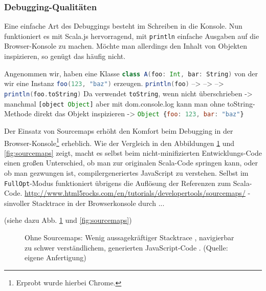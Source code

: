 \documentclass[a4paper, 12pt, hidelinks, listof=totoc, listoftables=totoc, bibliography=totoc]{scrreprt}
\newcommand{\code}[1]{\lstinline[language=Scala, style=inline]|#1|}
\newcommand{\scala}[1]{\lstinline[language=Scala, style=inline]|#1|}
\newcommand{\js}[1]{\lstinline[language=JavaScript, style=inline]|#1|}
\begin{document}
\subsubsection{Debugging-Qualitäten}


Eine einfache Art des Debuggings besteht im Schreiben in die Konsole. Nun funktioniert es mit Scala.js hervorragend, mit \scala{println} einfache Ausgaben auf die Browser-Konsole zu machen. Möchte man allerdings den Inhalt von Objekten inspizieren, so genügt das häufig nicht. 

Angenommen wir, haben eine Klasse \scala{class A(foo: Int, bar: String)} von der wir eine Instanz \scala{foo(123, "baz")} erzeugen. \scala{println(foo)} --> --> --> \scala{println(foo.toString)}
Da verwendet \scala{toString}, wenn nicht überschrieben -> manchmal \js{[object Object]}
aber mit dom.console.log kann man ohne toString-Methode direkt das Objekt inspizieren -> \js{Object {foo: 123, bar: "baz"}}

Der Einsatz von Sourcemaps erhöht den Komfort beim Debugging in der Browser-Konsole\footnote{Erprobt wurde hierbei Chrome.} erheblich. Wie der Vergleich in den Abbildungen \ref{fig:no-sourcemaps} und \ref{fig:sourcemaps} zeigt, macht es selbst beim nicht-minifizierten Entwicklungs-Code einen großen Unterschied, ob man zur originalen Scala-Code springen kann, oder ob man gezwungen ist, compilergeneriertes JavaScript zu verstehen. Selbst im \code{FullOpt}-Modus funktioniert übrigens die Auflösung der Referenzen zum Scala-Code.
\url{http://www.html5rocks.com/en/tutorials/developertools/sourcemaps/}
	- sinvoller Stacktrace in der Browserkonsole durch ...
	
	(siehe dazu Abb. \ref{fig:no-sourcemaps} und \ref{fig:sourcemaps})

\begin{figure}[!h]
	\centering
	\caption{Ohne Sourcemaps: Wenig aussagekräftiger Stacktrace \protect{}, navigierbar zu schwer verständlichem, generierten JavaScript-Code \protect{}. (Quelle: eigene Anfertigung)}
	\label{fig:no-sourcemaps}
\end{figure}
\end{document}
